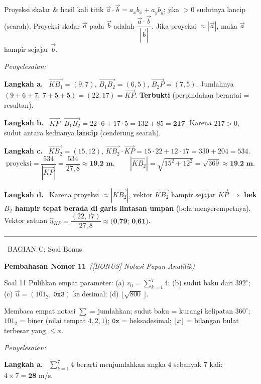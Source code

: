 \documentclass[11pt,a4paper]{article}
\newcommand{\jawab}{\par\smallskip\noindent\textit{\textcolor{oranye}{Penyelesaian:}}\par\smallskip}
\newcommand{\langkah}[1]{\par\smallskip\noindent\textbf{\textcolor{biru}{Langkah #1.}}\ }
\newcommand{\bagianjudul}[1]{\par\bigskip\noindent%
  {\large\bfseries\color{ungu}\rule[-2pt]{4pt}{16pt}\ #1}\par\smallskip}
\newcommand{\nomorjudul}[2]{\par\bigskip\noindent%
  {\large\bfseries\color{ungu}Pembahasan Nomor #1}\ {\normalfont\itshape\color{gray}(#2)}\par\nopagebreak\smallskip}
\begin{document}
\begin{ingat}{Proyeksi skalar \& hasil kali titik}
$\vec{a}\cdot\vec{b}=a_xb_x+a_yb_y$; jika $>0$ sudutnya lancip (searah).
Proyeksi skalar $\vec{a}$ pada $\vec{b}$ adalah $\dfrac{\vec{a}\cdot\vec{b}}{|\vec{b}|}$.
Jika proyeksi $\approx|\vec{a}|$, maka $\vec{a}$ hampir sejajar $\vec{b}$.
\end{ingat}

\jawab
\langkah{a} $\vec{KB_1}=(9,7)$, $\vec{B_1B_2}=(6,5)$, $\vec{B_2P}=(7,5)$. Jumlahnya
$(9+6+7,\ 7+5+5)=(22,17)=\vec{KP}$. \textbf{Terbukti} (perpindahan berantai =
resultan).

\langkah{b} $\vec{KP}\cdot\vec{B_1B_2}=22\cdot6+17\cdot5=132+85=\textbf{217}$. Karena
$217>0$, sudut antara keduanya \textbf{lancip} (cenderung searah).

\langkah{c} $\vec{KB_2}=(15,12)$, $\vec{KB_2}\cdot\vec{KP}=15\cdot22+12\cdot17=330+204=534$.
\[
\text{proyeksi}=\frac{534}{|\vec{KP}|}=\frac{534}{27{,}8}\approx\textbf{19{,}2 m},\qquad
|\vec{KB_2}|=\sqrt{15^2+12^2}=\sqrt{369}\approx\textbf{19{,}2 m}.
\]

\langkah{d} Karena proyeksi $\approx|\vec{KB_2}|$, vektor $\vec{KB_2}$ hampir sejajar
$\vec{KP}$ $\Rightarrow$ \textbf{bek $B_2$ hampir tepat berada di garis lintasan
umpan} (bola menyerempetnya). Vektor satuan
$\hat{u}_{KP}=\dfrac{(22,17)}{27{,}8}\approx\textbf{(0{,}79;\ 0{,}61)}$.

\bagianjudul{BAGIAN C: Soal Bonus}

\nomorjudul{11}{[BONUS] Notasi Papan Analitik}
\begin{soalbox}{Soal 11}
Pulihkan empat parameter: (a) $v_0=\sum_{k=1}^{7}4$; (b) sudut baku dari
$392^\circ$; (c) $\vec{u}=(101_2,\ \mathtt{0x3})$ ke desimal; (d) $\lfloor\sqrt{800}\,\rfloor$.
\end{soalbox}

\begin{ingat}{Membaca empat notasi}
$\sum$ = jumlahkan; sudut baku = kurangi kelipatan $360^\circ$; $101_2$ = biner
(nilai tempat $4,2,1$); $\mathtt{0x}$ = heksadesimal; $\lfloor x\rfloor$ =
bilangan bulat terbesar yang $\le x$.
\end{ingat}

\jawab
\langkah{a} $\sum_{k=1}^{7}4$ berarti menjumlahkan angka $4$ sebanyak $7$ kali:
$4\times7=\textbf{28}$ m/s.
\end{document}
